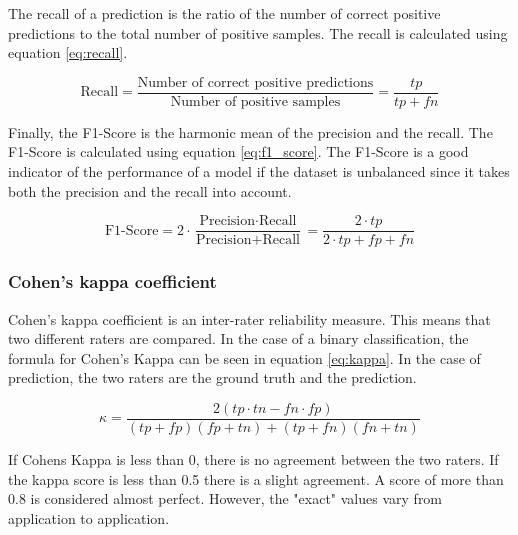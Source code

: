 The recall of a prediction is the ratio of the number of correct positive predictions to the total number of positive samples. The recall is calculated using equation \ref{eq:recall}.

\begin{equation}
    \label{eq:recall}
    \text{Recall} = \frac{\text{Number of correct positive predictions}}{\text{Number of positive samples}} = \frac{tp}{tp + fn}
\end{equation}

Finally, the F1-Score is the harmonic mean of the precision and the recall. The F1-Score is calculated using equation \ref{eq:f1_score}. The F1-Score is a good indicator of the performance of a model if the dataset is unbalanced since it takes both the precision and the recall into account.

\begin{equation}
    \label{eq:f1_score}
    \text{F1-Score} = 2 \cdot \frac{\text{Precision} \cdot \text{Recall}}{\text{Precision} + \text{Recall}} = \frac{2 \cdot tp}{2 \cdot tp + fp + fn}
\end{equation}

\subsubsection{Cohen's kappa coefficient}

Cohen's kappa coefficient is an inter-rater reliability measure\cite{kappa}. This means that two different raters are compared. In the case of a binary classification, the formula for Cohen's Kappa can be seen in equation \ref{eq:kappa}. In the case of prediction, the two raters are the ground truth and the prediction.

\begin{equation}
    \label{eq:kappa}
    \kappa = \frac{2(tp \cdot tn - fn \cdot fp)}{(tp + fp)(fp+tn) + (tp + fn)(fn + tn)}
\end{equation}

If Cohens Kappa is less than 0, there is no agreement between the two raters. If the kappa score is less than 0.5 there is a slight agreement. A score of more than 0.8 is considered almost perfect. However, the "exact" values vary from application to application.